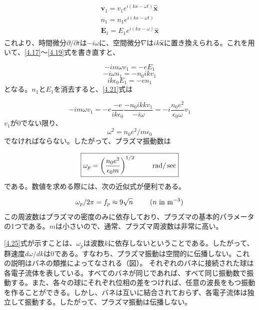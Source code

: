 \documentclass{ltjsarticle}
\numberwithin{equation}{section} %
\begin{document}
\begin{align}
  \begin{split}
    \bm{v}_1 = v_1 e^{i(kx - \omega t)}\hat{\bm{x}}\\
    n_1 = n_1e^{i(kx - \omega t)}\\
    \bm{E}_1 = E_1 e^{i(kx - \omega)}\hat{\bm{x}}
  \end{split} \label{4.20}
\end{align}
これより、時間微分$\partial/\partial t$は$-i\omega$に、空間微分$\nabla$は$ik\hat{\bm{x}}$に置き換えられる。これを用いて、\eqref{4.17}～\eqref{4.19}式を書き直すと、

\begin{equation}
  -im\omega v_1 = -eE_1 \label{4.21}
\end{equation}
\begin{equation}
  -i\omega n_1 = -n_0ikv_1 \label{4.22}
\end{equation}
\begin{equation}
  ik\epsilon_0 E_1 = -en_1 \label{4.23}
\end{equation}
となる。$n_1$と$E_1$を消去すると、\eqref{4.21}式は

\begin{equation}
  -im\omega v_1 = -e\frac{-e}{ik\epsilon_0}\frac{-n_0 ikkv_1}{-i\omega} =  -i\frac{n_0 e^2}{\epsilon_0 \omega}v_1 \label{4.24}
\end{equation}
$v_1$が0でない限り、
\[
  \omega^2 = n_0 e^2 / m\epsilon_0
\]
でなければならない。したがって、プラズマ振動数は

\begin{equation}
  \boxed{\omega_p = \left(\frac{n_0 e^2}{\epsilon_0 m}\right)^{1/2} \hspace{2pc} \text{rad}/\,\text{sec}}\label{4.25}
\end{equation}
である。数値を求める際には、次の近似式が便利である。

\begin{equation}
  \omega_p / 2\pi = f_p \approx 9\sqrt{n} \hspace{2pc} (n\ \text{in}\ \mathrm{m}^{-3}) \label{4.26}
\end{equation}
この周波数はプラズマの密度のみに依存しており、プラズマの基本的パラメータの1つである。$m$は小さいので、通常、プラズマ周波数は非常に高い。

\eqref{4.25}式が示すことは、$\omega_p$は波数$k$に依存しないということである。したがって、群速度$d\omega/dk$は0である。すなわち、プラズマ振動は空間的に伝播しない。これの説明はバネの類推によってなされる（図）。
それぞれのバネに接続された球は各電子流体を表している。すべてのバネが同じであれば、すべて同じ振動数で振動する。また、各々の球にそれぞれ位相の差をつければ、任意の波長をもつ振動を作ることができる。しかし、バネは互いに結合されておらず、各電子流体は独立して振動する。したがって、プラズマ振動は伝播しない。
\end{document}
